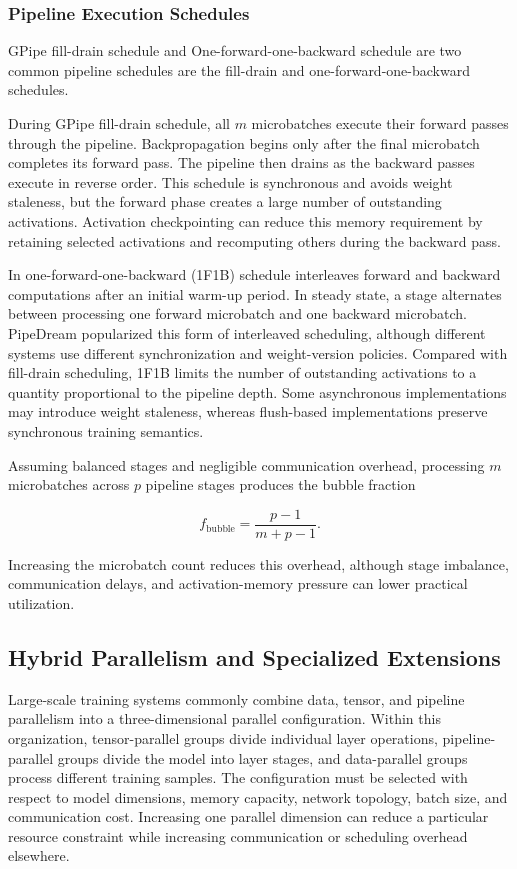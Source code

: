 \documentclass[11pt,journal,final, onecolumn]{IEEEtran}
\begin{document}
\subsubsection{Pipeline Execution Schedules}

GPipe fill-drain schedule and One-forward-one-backward schedule are two common pipeline schedules are the fill-drain and one-forward-one-backward schedules.

During GPipe fill-drain schedule, all \(m\) microbatches execute their forward passes through the pipeline. Backpropagation begins only after the final microbatch completes its forward pass. The pipeline then drains as the backward passes execute in reverse order. This schedule is synchronous and avoids weight staleness, but the forward phase creates a large number of outstanding activations. Activation checkpointing can reduce this memory requirement by retaining selected activations and recomputing others during the backward pass.

In one-forward-one-backward (1F1B) schedule interleaves forward and backward computations after an initial warm-up period. In steady state, a stage alternates between processing one forward microbatch and one backward microbatch. PipeDream popularized this form of interleaved scheduling, although different systems use different synchronization and weight-version policies. Compared with fill-drain scheduling, 1F1B limits the number of outstanding activations to a quantity proportional to the pipeline depth. Some asynchronous implementations may introduce weight staleness, whereas flush-based implementations preserve synchronous training semantics.

Assuming balanced stages and negligible communication overhead, processing
\(m\) microbatches across \(p\) pipeline stages produces the bubble fraction

\[
    f_{\mathrm{bubble}}
    = \frac{p-1}{m+p-1}.
\]

Increasing the microbatch count reduces this overhead, although stage
imbalance, communication delays, and activation-memory pressure can lower
practical utilization.


\subsection{Hybrid Parallelism and Specialized Extensions}
\label{subsec:hybrid-parallelism}

Large-scale training systems commonly combine data, tensor, and pipeline
parallelism into a three-dimensional parallel configuration. Within this organization, tensor-parallel groups divide individual layer
operations, pipeline-parallel groups divide the model into layer stages, and
data-parallel groups process different training samples. The configuration
must be selected with respect to model dimensions, memory capacity, network
topology, batch size, and communication cost. Increasing one parallel
dimension can reduce a particular resource constraint while increasing
communication or scheduling overhead elsewhere.
\end{document}
